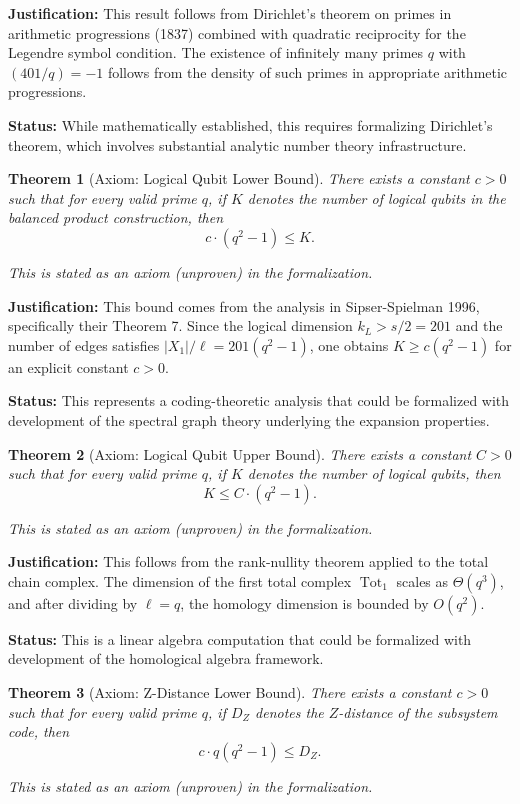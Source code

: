\documentclass[11pt]{article}
\theoremstyle{plain}
\newtheorem*{theorem}{Theorem}
\theoremstyle{definition}
\theoremstyle{remark}
\begin{document}
\textbf{Justification:} This result follows from Dirichlet's theorem on primes in arithmetic progressions (1837) combined with quadratic reciprocity for the Legendre symbol condition. The existence of infinitely many primes $q$ with $(401/q) = -1$ follows from the density of such primes in appropriate arithmetic progressions.

\textbf{Status:} While mathematically established, this requires formalizing Dirichlet's theorem, which involves substantial analytic number theory infrastructure.

\begin{theorem}[Axiom: Logical Qubit Lower Bound]
There exists a constant $c > 0$ such that for every valid prime $q$, if $K$ denotes the number of logical qubits in the balanced product construction, then
\[
c \cdot (q^2 - 1) \leq K.
\]

\textit{This is stated as an axiom (unproven) in the formalization.}
\end{theorem}

\textbf{Justification:} This bound comes from the analysis in Sipser-Spielman 1996, specifically their Theorem 7. Since the logical dimension $k_L > s/2 = 201$ and the number of edges satisfies $|X_1|/\ell = 201(q^2-1)$, one obtains $K \geq c(q^2-1)$ for an explicit constant $c > 0$.

\textbf{Status:} This represents a coding-theoretic analysis that could be formalized with development of the spectral graph theory underlying the expansion properties.

\begin{theorem}[Axiom: Logical Qubit Upper Bound]
There exists a constant $C > 0$ such that for every valid prime $q$, if $K$ denotes the number of logical qubits, then
\[
K \leq C \cdot (q^2 - 1).
\]

\textit{This is stated as an axiom (unproven) in the formalization.}
\end{theorem}

\textbf{Justification:} This follows from the rank-nullity theorem applied to the total chain complex. The dimension of the first total complex $\operatorname{Tot}_1$ scales as $\Theta(q^3)$, and after dividing by $\ell = q$, the homology dimension is bounded by $O(q^2)$.

\textbf{Status:} This is a linear algebra computation that could be formalized with development of the homological algebra framework.

\begin{theorem}[Axiom: Z-Distance Lower Bound]
There exists a constant $c > 0$ such that for every valid prime $q$, if $D_Z$ denotes the $Z$-distance of the subsystem code, then
\[
c \cdot q(q^2 - 1) \leq D_Z.
\]

\textit{This is stated as an axiom (unproven) in the formalization.}
\end{theorem}
\end{document}
